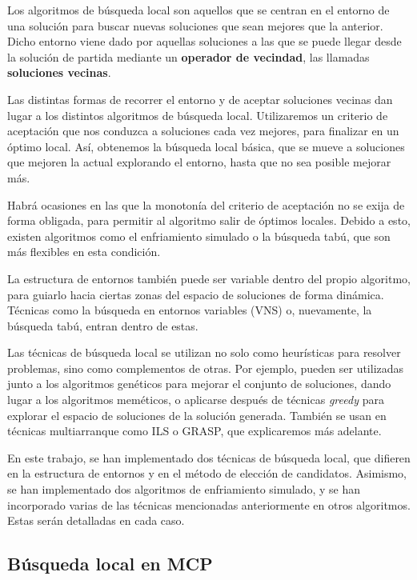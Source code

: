 Los algoritmos de búsqueda local son aquellos que se centran en el entorno de una
solución para buscar nuevas soluciones que sean mejores que la anterior. Dicho entorno
viene dado por aquellas soluciones a las que se puede llegar desde la solución de
partida mediante un \textbf{operador de vecindad}, las llamadas \textbf{soluciones vecinas}.

Las distintas formas de recorrer el entorno y de aceptar soluciones vecinas dan lugar
a los distintos algoritmos de búsqueda local. Utilizaremos un criterio de aceptación
que nos conduzca a soluciones cada vez mejores, para finalizar en un óptimo local.
Así, obtenemos la búsqueda local básica, que se mueve a soluciones que mejoren la
actual explorando el entorno, hasta que no sea posible mejorar más.

Habrá ocasiones en las que la monotonía del criterio de aceptación no se exija de
forma obligada, para permitir al algoritmo salir de óptimos locales. Debido a esto,
existen algoritmos como el enfriamiento simulado o la búsqueda tabú, que son más
flexibles en esta condición.

La estructura de entornos también puede ser variable dentro del propio algoritmo,
para guiarlo hacia ciertas zonas del espacio de soluciones de forma dinámica.
Técnicas como la búsqueda en entornos variables (VNS) o, nuevamente, la búsqueda tabú,
entran dentro de estas.

Las técnicas de búsqueda local se utilizan no solo como heurísticas para resolver
problemas, sino como complementos de otras. Por ejemplo, pueden ser utilizadas junto
a los algoritmos genéticos para mejorar el conjunto de soluciones, dando lugar a los
algoritmos meméticos, o aplicarse después de técnicas \textit{greedy} para explorar
el espacio de soluciones de la solución generada. También se usan en técnicas
multiarranque como ILS o GRASP, que explicaremos más adelante.

En este trabajo, se han implementado dos técnicas de búsqueda local, que difieren en
la estructura de entornos y en el método de elección de candidatos. Asimismo, se han
implementado dos algoritmos de enfriamiento simulado, y se han incorporado varias de
las técnicas mencionadas anteriormente en otros algoritmos. Estas serán detalladas en cada caso.

\subsection{Búsqueda local en MCP}

